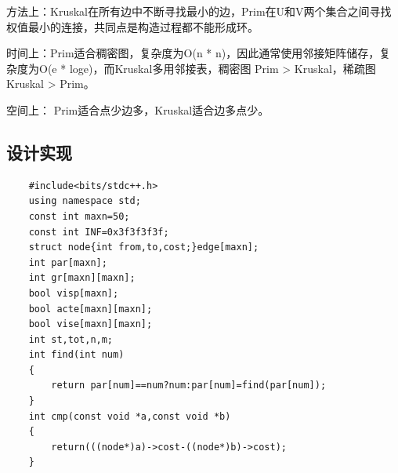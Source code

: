 \documentclass[UTF8,a4paper]{article}
\begin{document}
方法上：Kruskal在所有边中不断寻找最小的边，Prim在U和V两个集合之间寻找权值最小的连接，共同点是构造过程都不能形成环。

时间上：Prim适合稠密图，复杂度为O(n * n)，因此通常使用邻接矩阵储存，复杂度为O(e * loge)，而Kruskal多用邻接表，稠密图 Prim > Kruskal，稀疏图 Kruskal > Prim。

空间上： Prim适合点少边多，Kruskal适合边多点少。
\subsection{设计实现}
\begin{lstlisting}
    #include<bits/stdc++.h>
    using namespace std;
    const int maxn=50;
    const int INF=0x3f3f3f3f;
    struct node{int from,to,cost;}edge[maxn];
    int par[maxn];
    int gr[maxn][maxn];
    bool visp[maxn];
    bool acte[maxn][maxn];
    bool vise[maxn][maxn];
    int st,tot,n,m;
    int find(int num)
    {
        return par[num]==num?num:par[num]=find(par[num]);
    }
    int cmp(const void *a,const void *b)
    {
        return(((node*)a)->cost-((node*)b)->cost);
    }
    

\end{lstlisting}
\end{document}
